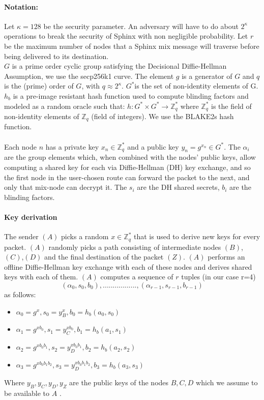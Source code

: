 \paragraph{Notation:}Let $\kappa=128$ be the security parameter. An adversary will have to do about $2^\kappa$ operations to break the security of Sphinx with non negligible probability.
Let $r$ be the maximum number of nodes that a Sphinx mix message will traverse before being delivered to its destination.
\\$G$ is a prime order cyclic group satisfying the Decisional Diffie-Hellman Assumption, we use the secp256k1 curve. The element $g$ is a generator of $G$ and $q$ is the (prime) order of $G$, with $q\approx2^{\kappa}$.
$G^*$is the set of non-identity elements of G. $h_b$ is a pre-image resistant hash function used to compute blinding factors and modeled as a random oracle such that:
$h:G^*\times G^*\rightarrow\mathbb{Z}^*_q$ where $\mathbb{Z}^*_q$ is the field of non-identity elements of $\mathbb{Z}_q$ (field of integers). We use the BLAKE2s hash function.
    \\~\\Each node $n$ has a private key $x_n\in \mathbb{Z}^*_q$ and a public key $y_n=g^{x_n}\in G^*$.
    The $\alpha_i$ are the group elements which, when combined with the nodes’ public keys, allow computing a shared key for each via Diffie-Hellman (DH) key exchange, and so the first node in the user-chosen route can forward the packet to the next, and only that mix-node can decrypt it.
    The $s_i$ are the DH shared secrets, $b_i$ are the blinding factors.

    \paragraph{Key derivation}
    The sender $(A)$ picks a random $x\in \mathbb{Z}^*_q$ that is used to derive new keys for every packet.
    \newline $(A)$ randomly picks a path consisting of intermediate nodes $(B)$, $(C)$,$(D)$ and the final destination of the packet $(Z)$.
    \newline $(A)$ performs an offline Diffie-Hellman key exchange with each of these nodes and derives shared keys with each of them.
    \newline $(A)$ computes a sequence of $r$ tuples (in our case r=4)  $$(\alpha_0,s_0,b_0),.................,(\alpha_{r-1},s_{r-1},b_{r-1})$$ as follows:
    \begin{itemize}
        \item $\alpha_0=g^x,s_0=y^x_B,b_0=h_b(a_0,s_0)$
        \item $\alpha_1=g^{xb_0},s_1=y^{xb_0}_C,b_1=h_b(a_1,s_1)$
        \item $\alpha_2=g^{xb_0b_1},s_2=y^{xb_0b_1}_D,b_2=h_b(a_2,s_2)$
        \item $\alpha_3=g^{xb_0b_1b_2},s_3=y^{xb_0b_1b_2}_D,b_3=h_b(a_3,s_3)$
    \end{itemize}
    Where $y_B,y_C,y_D,y_Z$ are the public keys of the nodes $B,C, D$  which we assume to be available to $A$ .
